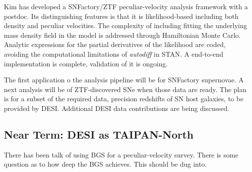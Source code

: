 \documentclass[11pt, oneside]{article}   	%
\begin{document}
Kim has developed a SNFactory/ZTF peculiar-velocity analysis framework with a postdoc.  Its distinguishing features is that it is likelihood-based
including both density and peculiar velocities.  The complexity of including fitting the underlying mass density field in the model
is addressed through Hamiltonian Monte Carlo.  Analytic expressions for the partial derivatives of the likelihood are coded,
avoiding the computational limitations of {\it autodiff} in STAN.  A end-to-end implementation is complete, validation of it is ongoing.

The first application o the analysis pipeline will be for SNFactory supernovae.  A next analysis will be of ZTF-discovered 
SNe when those data are ready.  The plan is for a  subset of the required data, precision redshifts of SN host galaxies, to be provided
by DESI.  Additional DESI data contributions are being discussed.

\subsection{Near Term: DESI as TAIPAN-North}

There has been talk of using BGS for a peculiar-velocity survey.  There is some question as to how deep the BGS achieves.  This should be
dug into.
\end{document}
